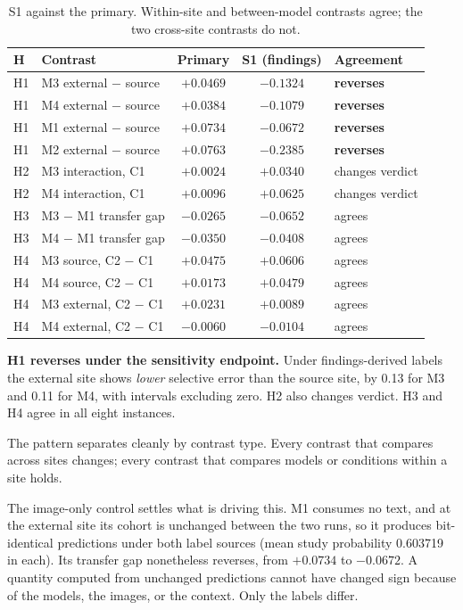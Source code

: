 \begin{table}[htbp]
\centering
\caption{S1 against the primary. Within-site and between-model contrasts agree;
the two cross-site contrasts do not.}
\label{tab:s1}
\begin{tabular}{llccl}
\toprule
H & Contrast & Primary & S1 (findings) & Agreement \\
\midrule
H1 & M3 external $-$ source & $+0.0469$ & $-0.1324$ & \textbf{reverses} \\
H1 & M4 external $-$ source & $+0.0384$ & $-0.1079$ & \textbf{reverses} \\
H1 & M1 external $-$ source & $+0.0734$ & $-0.0672$ & \textbf{reverses} \\
H1 & M2 external $-$ source & $+0.0763$ & $-0.2385$ & \textbf{reverses} \\
H2 & M3 interaction, C1     & $+0.0024$ & $+0.0340$ & changes verdict \\
H2 & M4 interaction, C1     & $+0.0096$ & $+0.0625$ & changes verdict \\
H3 & M3 $-$ M1 transfer gap & $-0.0265$ & $-0.0652$ & agrees \\
H3 & M4 $-$ M1 transfer gap & $-0.0350$ & $-0.0408$ & agrees \\
H4 & M3 source, C2 $-$ C1   & $+0.0475$ & $+0.0606$ & agrees \\
H4 & M4 source, C2 $-$ C1   & $+0.0173$ & $+0.0479$ & agrees \\
H4 & M3 external, C2 $-$ C1 & $+0.0231$ & $+0.0089$ & agrees \\
H4 & M4 external, C2 $-$ C1 & $-0.0060$ & $-0.0104$ & agrees \\
\bottomrule
\end{tabular}
\end{table}

\textbf{H1 reverses under the sensitivity endpoint.} Under findings-derived
labels the external site shows \emph{lower} selective error than the source
site, by \num{0.13} for M3 and \num{0.11} for M4, with intervals excluding zero.
H2 also changes verdict. H3 and H4 agree in all eight instances.

The pattern separates cleanly by contrast type. Every contrast that compares
across sites changes; every contrast that compares models or conditions within a
site holds.

The image-only control settles what is driving this. M1 consumes no text, and at
the external site its cohort is unchanged between the two runs, so it produces
bit-identical predictions under both label sources (mean study probability
\num{0.603719} in each). Its transfer gap nonetheless reverses, from $+0.0734$
to $-0.0672$. A quantity computed from unchanged predictions cannot have changed
sign because of the models, the images, or the context. Only the labels differ.

